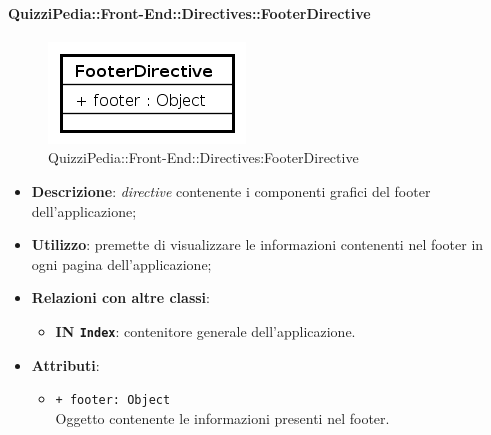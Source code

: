 \paragraph{QuizziPedia::Front-End::Directives::FooterDirective}
\begin{figure} [ht]
	\centering
	\includegraphics[scale=0.80]{UML/Classi/Front-End/QuizziPedia_Front-end_FooterDirective.png}
	\caption{QuizziPedia::Front-End::Directives:FooterDirective}
\end{figure} \FloatBarrier
\begin{itemize}
	\item \textbf{Descrizione}: \textit{directive} contenente i componenti grafici del footer dell'applicazione;
	\item \textbf{Utilizzo}: premette di visualizzare le informazioni contenenti nel footer in ogni pagina dell'applicazione;
	\item \textbf{Relazioni con altre classi}:
	\begin{itemize}
		\item \textbf{IN \texttt{Index}}: contenitore generale dell'applicazione.
	\end{itemize}
	\item \textbf{Attributi}:
	\begin{itemize}
		\item \texttt{+ footer: Object} \\ Oggetto contenente le informazioni presenti nel footer.
	\end{itemize}
\end{itemize}